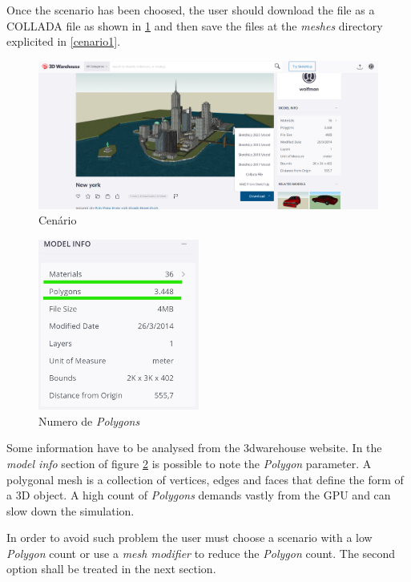 		Once the scenario has been choosed, the user should download the file as a COLLADA file as shown in \ref{ny} and then save the files at the \textit{meshes} directory explicited in \ref{cenario1}.
		
		
		\begin{figure}[!ht]
			\centering
			\includegraphics[width=350pt]{figuras/ny.png}
			\caption{Cenário}
			\label{ny}
		\end{figure}
		
		
		\begin{figure}[!ht]
			\centering
			\includegraphics[width=150pt]{figuras/modelinfo.png}
			\caption{Numero de \textit{Polygons}}
			\label{modelinfo}
		\end{figure}
		
		Some information have to be analysed from the 3dwarehouse website. In the \textit{model info} section of figure \ref{modelinfo} is possible to note the \textit{Polygon} parameter. A polygonal mesh is a collection of vertices, edges and faces that define the form of a 3D object. A high count of \textit{Polygons} demands vastly from the GPU and can slow down the simulation. 
		
		In order to avoid such problem the user must choose a scenario with a low \textit{Polygon} count or use a \textit{mesh modifier} to reduce the \textit{Polygon} count. The second option shall be treated in the next section.

		
		
